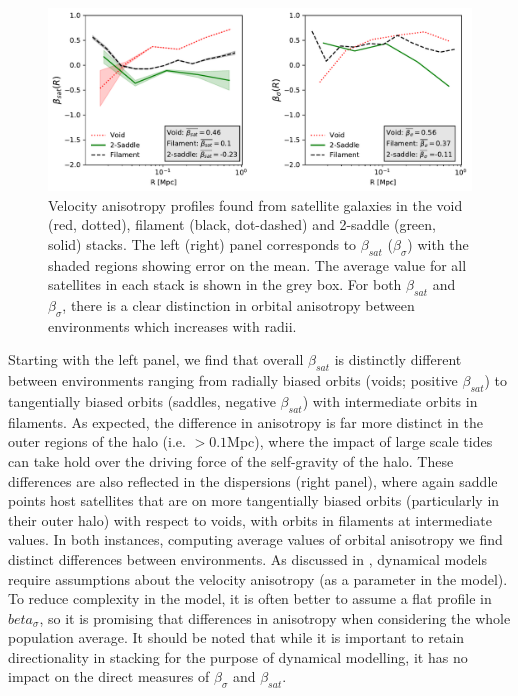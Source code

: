\begin{figure}
	\includegraphics[width=\linewidth]{thesis/latex/dyn_mod_files/disperse_beta_paper.pdf}
    \caption{Velocity anisotropy profiles found from satellite galaxies in the void (red, dotted), filament (black, dot-dashed) and 2-saddle (green, solid) stacks. The left (right) panel corresponds to $\beta_{sat}$ ($\beta_{\sigma}$) with the shaded regions showing error on the mean. The average value for all satellites in each stack is shown in the grey box. For both $\beta_{sat}$ and $\beta_{\sigma}$, there is a clear distinction in orbital anisotropy between environments which increases with radii.}
    \label{fig:beta_stack}
\end{figure}

Starting with the left panel, we find that overall $\beta_{sat}$ is distinctly different between environments ranging from radially biased orbits (voids; positive $\beta_{sat}$) to tangentially biased orbits (saddles, negative $\beta_{sat}$) with intermediate orbits in filaments. As expected, the difference in anisotropy is far more distinct in the outer regions of the halo (i.e. $> 0.1$Mpc), where the impact of large scale tides can take hold over the driving force of the self-gravity of the halo. These differences are also reflected in the dispersions (right panel), where again saddle points host satellites that are on more tangentially biased orbits (particularly in their outer halo) with respect to voids, with orbits in filaments at intermediate values. In both instances, computing average values of orbital anisotropy we find distinct differences between environments. As discussed in \red{\S}, dynamical models require assumptions about the velocity anisotropy (as a parameter in the model). To reduce complexity in the model, it is often better to assume a flat profile in $beta_{\sigma}$, so it is promising that differences in anisotropy when considering the whole population average. It should be noted that while it is important to retain directionality in stacking for the purpose of dynamical modelling, it has no impact on the direct measures of $\beta_{\sigma}$ and $\beta_{sat}$.

